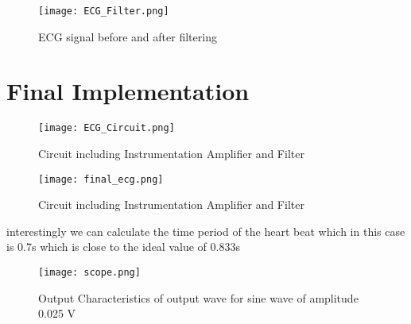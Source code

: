 \documentclass{article}
\begin{document}
\begin{figure}[h]
  \centering
  \texttt{[image: ECG\_Filter.png]} 
  \caption{ECG signal before and after filtering}
  \label{fig:instrumentation-amp}
\end{figure}
\newpage
\section{Final Implementation}
\begin{figure}[h]
  \centering
  \texttt{[image: ECG\_Circuit.png]} 
  \caption{Circuit including Instrumentation Amplifier and Filter}
  \label{fig:instrumentation-amp}
\end{figure}

\begin{figure}[h]
  \centering
  \texttt{[image: final\_ecg.png]} 
  \caption{Circuit including Instrumentation Amplifier and Filter}
  \label{fig:instrumentation-amp}
\end{figure}

interestingly we can calculate the time period  of the heart beat which in this case is 0.7s which is close to the ideal value of 0.833s

\begin{figure}[h]
  \centering
  \texttt{[image: scope.png]} 
  \caption{Output Characteristics of output wave for sine wave of amplitude 0.025 V}
  \label{fig:instrumentation-amp}
\end{figure}
\end{document}
